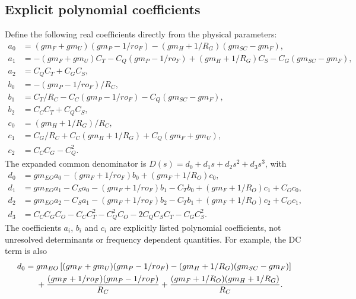 \documentclass[11pt]{article}
\begin{document}
\subsection*{Explicit polynomial coefficients}
Define the following real coefficients directly from the physical parameters:
\begin{align}
a_0&=(gm_F+gm_U)(gm_P-1/ro_F)-(gm_H+1/R_G)(gm_{SC}-gm_F),\\
a_1&=-(gm_F+gm_U)C_T-C_Q(gm_P-1/ro_F)
+(gm_H+1/R_G)C_S-C_G(gm_{SC}-gm_F),\\
a_2&=C_QC_T+C_GC_S,\\
b_0&=-(gm_P-1/ro_F)/R_C,\\
b_1&=C_T/R_C-C_C(gm_P-1/ro_F)-C_Q(gm_{SC}-gm_F),\\
b_2&=C_CC_T+C_QC_S,\\
c_0&=(gm_H+1/R_G)/R_C,\\
c_1&=C_G/R_C+C_C(gm_H+1/R_G)+C_Q(gm_F+gm_U),\\
c_2&=C_CC_G-C_Q^2.
\end{align}
The expanded common denominator is $D(s)=d_0+d_1s+d_2s^2+d_3s^3$, with
\begin{align}
d_0&=gm_{EO}a_0-(gm_F+1/ro_F)b_0+(gm_F+1/R_O)c_0,\\
d_1&=gm_{EO}a_1-C_Sa_0-(gm_F+1/ro_F)b_1-C_Tb_0
+(gm_F+1/R_O)c_1+C_Oc_0,\\
d_2&=gm_{EO}a_2-C_Sa_1-(gm_F+1/ro_F)b_2-C_Tb_1
+(gm_F+1/R_O)c_2+C_Oc_1,\\
d_3&=C_CC_GC_O-C_CC_T^2-C_Q^2C_O-2C_QC_SC_T-C_GC_S^2.
\end{align}
The coefficients $a_i$, $b_i$ and $c_i$ are explicitly listed polynomial coefficients, not unresolved determinants or frequency dependent quantities. For example, the DC term is also
\begin{align}
d_0={}&gm_{EO}\left[(gm_F+gm_U)(gm_P-1/ro_F)
 -(gm_H+1/R_G)(gm_{SC}-gm_F)\right]\notag\\
&+\frac{(gm_F+1/ro_F)(gm_P-1/ro_F)}{R_C}
+\frac{(gm_F+1/R_O)(gm_H+1/R_G)}{R_C}.
\end{align}
\end{document}
